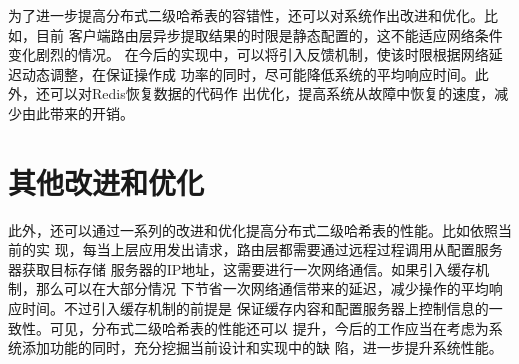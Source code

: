 为了进一步提高分布式二级哈希表的容错性，还可以对系统作出改进和优化。比如，目前
客户端路由层异步提取结果的时限是静态配置的，这不能适应网络条件变化剧烈的情况。
在今后的实现中，可以将引入反馈机制，使该时限根据网络延迟动态调整，在保证操作成
功率的同时，尽可能降低系统的平均响应时间。此外，还可以对Redis恢复数据的代码作
出优化，提高系统从故障中恢复的速度，减少由此带来的开销。

\section{其他改进和优化}
此外，还可以通过一系列的改进和优化提高分布式二级哈希表的性能。比如依照当前的实
现，每当上层应用发出请求，路由层都需要通过远程过程调用从配置服务器获取目标存储
服务器的IP地址，这需要进行一次网络通信。如果引入缓存机制，那么可以在大部分情况
下节省一次网络通信带来的延迟，减少操作的平均响应时间。不过引入缓存机制的前提是
保证缓存内容和配置服务器上控制信息的一致性。可见，分布式二级哈希表的性能还可以
提升，今后的工作应当在考虑为系统添加功能的同时，充分挖掘当前设计和实现中的缺
陷，进一步提升系统性能。

